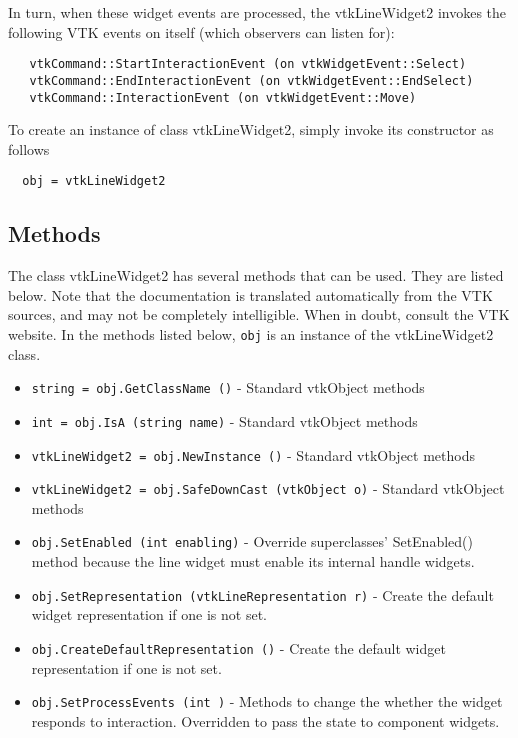  In turn, when these widget events are processed, the vtkLineWidget2
 invokes the following VTK events on itself (which observers can listen for):
 \begin{verbatim}
   vtkCommand::StartInteractionEvent (on vtkWidgetEvent::Select)
   vtkCommand::EndInteractionEvent (on vtkWidgetEvent::EndSelect)
   vtkCommand::InteractionEvent (on vtkWidgetEvent::Move)
 \end{verbatim}


To create an instance of class vtkLineWidget2, simply
invoke its constructor as follows
\begin{verbatim}
  obj = vtkLineWidget2
\end{verbatim}
\subsection{Methods}

The class vtkLineWidget2 has several methods that can be used.
  They are listed below.
Note that the documentation is translated automatically from the VTK sources,
and may not be completely intelligible.  When in doubt, consult the VTK website.
In the methods listed below, \verb|obj| is an instance of the vtkLineWidget2 class.
\begin{itemize}
\item  \verb|string = obj.GetClassName ()| -  Standard vtkObject methods

\item  \verb|int = obj.IsA (string name)| -  Standard vtkObject methods

\item  \verb|vtkLineWidget2 = obj.NewInstance ()| -  Standard vtkObject methods

\item  \verb|vtkLineWidget2 = obj.SafeDownCast (vtkObject o)| -  Standard vtkObject methods

\item  \verb|obj.SetEnabled (int enabling)| -  Override superclasses' SetEnabled() method because the line
 widget must enable its internal handle widgets.

\item  \verb|obj.SetRepresentation (vtkLineRepresentation r)| -  Create the default widget representation if one is not set. 

\item  \verb|obj.CreateDefaultRepresentation ()| -  Create the default widget representation if one is not set. 

\item  \verb|obj.SetProcessEvents (int )| -  Methods to change the whether the widget responds to interaction.
 Overridden to pass the state to component widgets.

\end{itemize}
